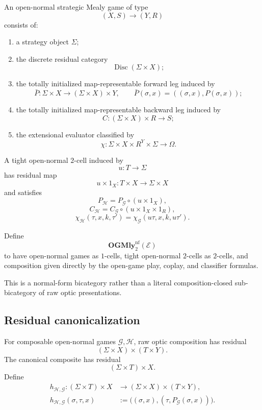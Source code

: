 \begin{definition}
\label{def:open-normal-strategic-mealy-game}
An open-normal strategic Mealy game of type
\[
  (X,S)\longrightarrow(Y,R)
\]
consists of:
\begin{enumerate}
  \item a strategy object \(\Sigma\);
  \item the discrete residual category
  \[
    \operatorname{Disc}(\Sigma\times X);
  \]
  \item the totally initialized map-representable forward leg induced by
  \[
    \bar P:
    \Sigma\times X
    \longrightarrow
    (\Sigma\times X)\times Y,
    \qquad
    \bar P(\sigma,x)
    =
    ((\sigma,x),P(\sigma,x));
  \]
  \item the totally initialized map-representable backward leg induced by
  \[
    C:
    (\Sigma\times X)\times R
    \longrightarrow
    S;
  \]
  \item the extensional evaluator classified by
  \[
    \chi:
    \Sigma\times X\times R^Y\times\Sigma
    \longrightarrow
    \Omega.
  \]
\end{enumerate}
\end{definition}

A tight open-normal \(2\)-cell induced by
\[
  u:T\to\Sigma
\]
has residual map
\[
  u\times1_X:
  T\times X\to\Sigma\times X
\]
and satisfies
\[
  P_{\mathcal H}
  =
  P_{\mathcal G}\circ(u\times1_X),
\]
\[
  C_{\mathcal H}
  =
  C_{\mathcal G}
  \circ(u\times1_X\times1_R),
\]
\[
  \chi_{\mathcal H}(\tau,x,k,\tau')
  =
  \chi_{\mathcal G}(u\tau,x,k,u\tau').
\]

Define
\[
  \mathbf{OGMly}^{\mathrm{nf}}_2(\mathcal E)
\]
to have open-normal games as \(1\)-cells, tight open-normal \(2\)-cells as \(2\)-cells, and
composition given directly by the open-game play, coplay, and classifier formulas.

This is a normal-form bicategory rather than a literal composition-closed sub-bicategory of raw
optic presentations.

\subsection{Residual canonicalization}

For composable open-normal games \(\mathcal G,\mathcal H\), raw optic composition has residual
\[
  (\Sigma\times X)\times(T\times Y).
\]
The canonical composite has residual
\[
  (\Sigma\times T)\times X.
\]
Define
\[
\begin{aligned}
  h_{\mathcal H,\mathcal G}:
  (\Sigma\times T)\times X
  &\longrightarrow
  (\Sigma\times X)\times(T\times Y),
  \\
  h_{\mathcal H,\mathcal G}(\sigma,\tau,x)
  &:=
  \bigl(
    (\sigma,x),
    (\tau,P_{\mathcal G}(\sigma,x))
  \bigr).
\end{aligned}
\]

